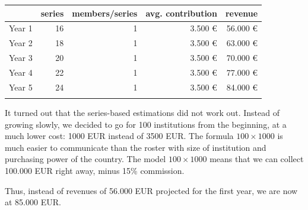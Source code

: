 \documentclass[output=guidelines,nonflat,smallfont,
draftmode
]{langsci/langscibook}
\newcommand{\evaluation}[1]{
  \renewcommand{\tblslinecolour}{lsLightOrange}
  \tblssy{receipt}{Evaluation}{\vspace*{-5mm}#1}
}
\renewcommand{\tblssy}[4][black!12]{%
  \renewcommand{\langscisymbol}{#2}\renewcommand{\tblsboxcolor}{#1}
  \begin{mdframed}[style=yellowexercise,frametitle={#3}]
    #4
  \end{mdframed}
}
\begin{document}
{\noindent
\begin{tabularx}{\textwidth}{Xrrrr}
\lsptoprule
        &  series&  members/series&       avg. contribution &     revenue\\
\midrule
Year 1 &  16               &       1                                    &        3.500 €                                               &     56.000 €                                     \\
Year 2 &  18               &       1                                    &        3.500 €                                               &     63.000 €                                     \\
Year 3 &  20               &       1                                    &        3.500 €                                               &     70.000 €                                     \\
Year 4 &  22               &       1                                    &        3.500 €                                               &     77.000 €                                     \\
Year 5 &  24               &       1                                    &        3.500 €                                               &     84.000 €                                     \\
\lspbottomrule
\end{tabularx}
}
\evaluation{
It turned out that the series-based estimations did not work out. Instead of growing slowly, we decided to go for 100 institutions from the beginning, at a much lower cost: 1000 EUR instead of 3500 EUR. The formula $100 \times 1000$ is much easier to communicate than the roster with size of institution and purchasing power of the country. The model $100 \times 1000$ means that we can collect 100.000 EUR right away, minus 15\% commission. 

Thus, instead of revenues of 56.000 EUR projected for the first year, we are now at 85.000 EUR. 
}
\end{document}
